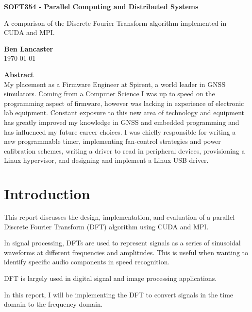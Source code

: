 \documentclass[11pt,a4paper]{article}
\begin{document}
\begin{titlepage}
\begin{center}

\vspace*{3cm}
\Large
\textbf{SOFT354 - Parallel Computing and Distributed Systems}

\vspace{0.4cm}
\large
A comparison of the Discrete Fourier Transform algorithm implemented in CUDA and MPI.

\vspace{4cm}
\textbf{Ben Lancaster}\\
\today

\vspace{4cm}
\textbf{Abstract}\\
\small
My placement as a Firmware Engineer at Spirent, a world leader in GNSS simulators. Coming from a Computer Science I was up to speed on the programming aspect of firmware, however was lacking in experience of electronic lab equipment. Constant exposure to this new area of technology and equipment has greatly improved my knowledge in GNSS and embedded programming and has influenced my future career choices. I was chiefly responsible for writing a new programmable timer, implementing fan-control strategies and power calibration schemes, writing a driver to read in peripheral devices, provisioning a Linux hypervisor, and designing and implement a Linux USB driver.

\end{center}

\end{titlepage}

\renewcommand*\contentsname{Table of Contents}
\tableofcontents
\newpage

\section{Introduction}
This report discusses the design, implementation, and evaluation of a parallel Discrete Fourier Transform (DFT) algorithm using CUDA and MPI.

In signal processing, DFTs are used to represent signals as a series of sinusoidal waveforms at different frequencies and amplitudes. This is useful when wanting to identify specific audio components in speed recognition. 

DFT is largely used in digital signal and image processing applications. 

In this report, I will be implementing the DFT to convert signals in the time domain to the frequency domain.
\end{document}
